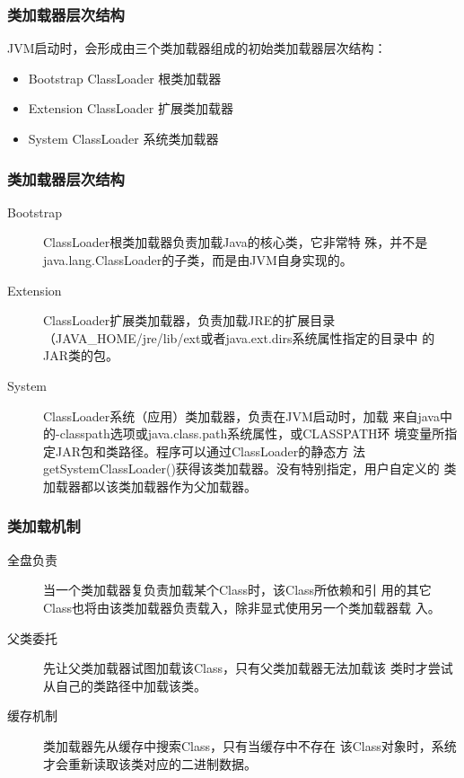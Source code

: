 \begin{frame}[fragile] %
\frametitle{类加载器层次结构}

JVM启动时，会形成由三个类加载器组成的初始类加载器层次结构：

\begin{itemize}\kai
\item Bootstrap ClassLoader  根类加载器
\item Extension ClassLoader  扩展类加载器
\item System ClassLoader  系统类加载器
\end{itemize}
\end{frame}

\begin{frame}[fragile] %
  \frametitle{类加载器层次结构}
  
  \begin{description}
  \item[Bootstrap] ClassLoader{\Red 根类加载器}负责加载Java的核心类，它非常特
    殊，并不是java.lang.ClassLoader的子类，而是由JVM自身实现的。
  \item[Extension] ClassLoader{\Blue 扩展类加载器}，负责加载JRE的扩展目录
    （JAVA\_HOME/jre/lib/ext或者java.ext.dirs系统属性指定的目录中
    的JAR类的包。
  \item[System] ClassLoader{\Mage 系统（应用）类加载器}，负责在JVM启动时，加载
    来自java中的-classpath选项或java.class.path系统属性，或CLASSPATH环
    境变量所指定JAR包和类路径。程序可以通过ClassLoader的静态方
    法getSystemClassLoader()获得该类加载器。没有特别指定，用户自定义的
    类加载器都以该类加载器作为父加载器。
\end{description}


\end{frame}

\begin{frame}[fragile] %
\frametitle{类加载机制}


\begin{description}
\item[全盘负责] 当一个类加载器复负责加载某个Class时，该Class所依赖和引
  用的其它Class也将由该类加载器负责载入，除非显式使用另一个类加载器载
  入。
\item[父类委托] 先让父类加载器试图加载该Class，只有父类加载器无法加载该
  类时才尝试从自己的类路径中加载该类。
\item[缓存机制] 类加载器先从缓存中搜索Class，只有当缓存中不存在
  该Class对象时，系统才会重新读取该类对应的二进制数据。
\end{description}

\end{frame}

